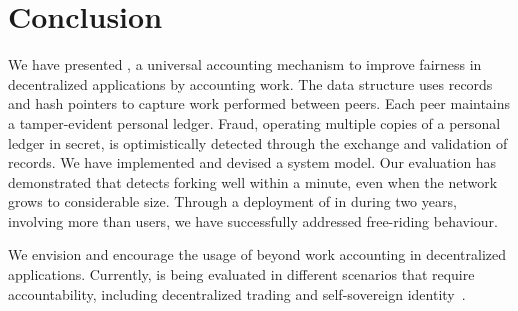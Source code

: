 
\section{Conclusion}
We have presented \ModelName{}, a universal accounting mechanism to improve fairness in decentralized applications by accounting work.
The \ModelName{} data structure uses records and hash pointers to capture work performed between peers.
Each peer maintains a tamper-evident personal ledger.
Fraud, operating multiple copies of a personal ledger in secret, is optimistically detected through the exchange and validation of records.
We have implemented \ModelName{} and devised a system model.
Our evaluation has demonstrated that \ModelName{} detects forking well within a minute, even when the network grows to considerable size.
Through a deployment of \ModelName{} in \Tribler{} during two years, involving more than \TrialUsers{} users, we have successfully addressed free-riding behaviour.

We envision and encourage the usage of \ModelName{} beyond work accounting in decentralized applications.
Currently, \ModelName{} is being evaluated in different scenarios that require accountability, including decentralized trading and self-sovereign identity~\cite{de2020xchange,stokkink2018deployment}.